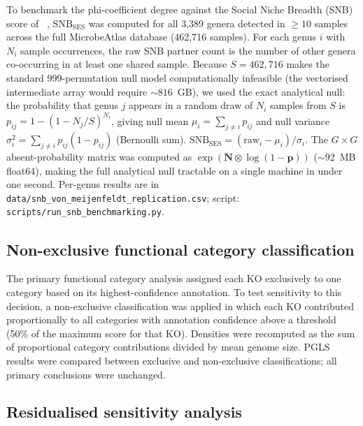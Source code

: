 \documentclass[times]{zHenriquesLab-StyleBioRxiv}
\begin{document}
To benchmark the phi-coefficient degree against the Social Niche Breadth (SNB)
score of \citeauthor{vonmeijenfeldt2023}~\cite{vonmeijenfeldt2023},
$\text{SNB}_\text{SES}$ was computed for all 3{,}389 genera detected in
$\ge 10$ samples across the full MicrobeAtlas database (462{,}716 samples).
For each genus $i$ with $N_i$ sample occurrences, the raw SNB partner count
is the number of other genera co-occurring in at least one shared sample.
Because $S = 462{,}716$ makes the standard 999-permutation null model
computationally infeasible (the vectorised intermediate array would require
${\sim}816$~GB), we used the exact analytical null: the probability that genus
$j$ appears in a random draw of $N_i$ samples from $S$ is
$p_{ij} = 1 - (1 - N_j/S)^{N_i}$, giving null mean
$\mu_i = \sum_{j \ne i} p_{ij}$ and null variance
$\sigma_i^2 = \sum_{j \ne i} p_{ij}(1 - p_{ij})$ (Bernoulli sum).
$\text{SNB}_\text{SES} = (\text{raw}_i - \mu_i)/\sigma_i$.
The $G \times G$ absent-probability matrix was computed as
$\exp(\mathbf{N} \otimes \log(1 - \mathbf{p}))$ (${\sim}92$~MB float64),
making the full analytical null tractable on a single machine in under one
second. Per-genus results are in \texttt{data/snb\_von\_meijenfeldt\_replication.csv};
script: \texttt{scripts/run\_snb\_benchmarking.py}.

\subsection{Non-exclusive functional category classification}

The primary functional category analysis assigned each KO exclusively to one
category based on its highest-confidence annotation. To test sensitivity to this
decision, a non-exclusive classification was applied in which each KO contributed
proportionally to all categories with annotation confidence above a threshold
(50\% of the maximum score for that KO). Densities were recomputed as the sum of
proportional category contributions divided by mean genome size. PGLS results
were compared between exclusive and non-exclusive classifications; all primary
conclusions were unchanged.

\subsection{Residualised sensitivity analysis}
\end{document}
